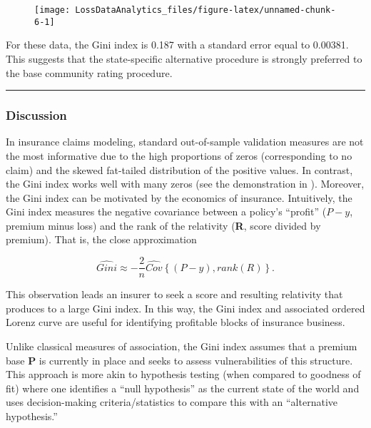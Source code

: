 \documentclass[]{book}
\theoremstyle{definition}
\theoremstyle{definition}
\theoremstyle{definition}
\theoremstyle{remark}
\begin{document}
\begin{figure}

{\centering \texttt{[image: LossDataAnalytics\_files/figure-latex/unnamed-chunk-6-1]} 

}

\end{figure}

For these data, the Gini index is 0.187 with a standard error equal to
0.00381. This suggests that the state-specific alternative procedure is
strongly preferred to the base community rating procedure.

\begin{center}\rule{0.5\linewidth}{\linethickness}\end{center}

\subsubsection*{Discussion}\label{discussion}

In insurance claims modeling, standard out-of-sample validation measures
are not the most informative due to the high proportions of zeros
(corresponding to no claim) and the skewed fat-tailed distribution of
the positive values. In contrast, the Gini index works well with many
zeros (see the demonstration in \citep{frees2014insurance}). Moreover,
the Gini index can be motivated by the economics of insurance.
Intuitively, the Gini index measures the negative covariance between a
policy's ``profit'' (\(P-y\), premium minus loss) and the rank of the
relativity (\textbf{R}, score divided by premium). That is, the close
approximation

\[\widehat{Gini} \approx - \frac{2}{n} \widehat{Cov} \left\{ (P-y), rank(R) \right\} .\]

This observation leads an insurer to seek a score and resulting
relativity that produces to a large Gini index. In this way, the Gini
index and associated ordered Lorenz curve are useful for identifying
profitable blocks of insurance business.

Unlike classical measures of association, the Gini index assumes that a
premium base \textbf{P} is currently in place and seeks to assess
vulnerabilities of this structure. This approach is more akin to
hypothesis testing (when compared to goodness of fit) where one
identifies a ``null hypothesis'' as the current state of the world and
uses decision-making criteria/statistics to compare this with an
``alternative hypothesis.''
\end{document}
